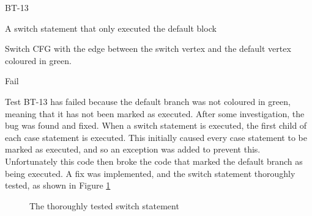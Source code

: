 \begin{minipage}{0.6\textwidth}
\begin{description}[style=sameline,leftmargin=3.5cm,nolistsep]
\item[\hspace*{0.3cm}Label] BT-13
\item[\hspace*{0.3cm}Description] A switch statement that only executed the default block
\item[\hspace*{0.3cm}Expected Output] Switch CFG with the edge between the switch vertex and the default vertex coloured in green. 
\item[\hspace*{0.3cm}Result] Fail
\end{description}
\end{minipage}
\begin{minipage}{0.39\textwidth}
\centering
{}
\end{minipage}

Test BT-13 has failed because the default branch was not coloured in green, meaning that it has not been marked as executed. After some investigation, the bug was found and fixed. When a switch statement is executed, the first child of each case statement is executed. This initially caused every case statement to be marked as executed, and so an exception was added to prevent this. Unfortunately this code then broke the code that marked the default branch as being executed. A fix was implemented, and the switch statement thoroughly tested, as shown in Figure \ref{fig:testSwitch}

\begin{figure}
\begin{minipage}{0.19\textwidth}
\end{minipage}
\begin{minipage}{0.19\textwidth}
\end{minipage}
\begin{minipage}{0.19\textwidth}
\end{minipage}
\begin{minipage}{0.19\textwidth}
\end{minipage}
\begin{minipage}{0.19\textwidth}
\end{minipage}
\caption{The thoroughly tested switch statement}
\label{fig:testSwitch}
\end{figure}

